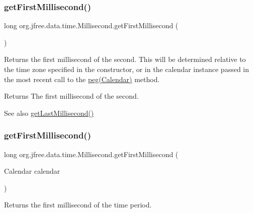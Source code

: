\subsubsection{\texorpdfstring{get\+First\+Millisecond()}{getFirstMillisecond()}\hspace{0.1cm}{\footnotesize\ttfamily [1/2]}}
{\footnotesize\ttfamily long org.\+jfree.\+data.\+time.\+Millisecond.\+get\+First\+Millisecond (\begin{DoxyParamCaption}{ }\end{DoxyParamCaption})}

Returns the first millisecond of the second. This will be determined relative to the time zone specified in the constructor, or in the calendar instance passed in the most recent call to the \mbox{\hyperlink{classorg_1_1jfree_1_1data_1_1time_1_1_millisecond_ae9a69e2252d3319a76b4592798b9b1aa}{peg(\+Calendar)}} method.

\begin{DoxyReturn}{Returns}
The first millisecond of the second.
\end{DoxyReturn}
\begin{DoxySeeAlso}{See also}
\mbox{\hyperlink{classorg_1_1jfree_1_1data_1_1time_1_1_millisecond_ac9a80b0e4405e3fdedf5bd1ba4f3460a}{get\+Last\+Millisecond()}} 
\end{DoxySeeAlso}
\mbox{\label{classorg_1_1jfree_1_1data_1_1time_1_1_millisecond_ab5b4b79c1abe4d5dbf283b48ab24ec53}} 
\subsubsection{\texorpdfstring{get\+First\+Millisecond()}{getFirstMillisecond()}\hspace{0.1cm}{\footnotesize\ttfamily [2/2]}}
{\footnotesize\ttfamily long org.\+jfree.\+data.\+time.\+Millisecond.\+get\+First\+Millisecond (\begin{DoxyParamCaption}\item[{Calendar}]{calendar }\end{DoxyParamCaption})}

Returns the first millisecond of the time period.


